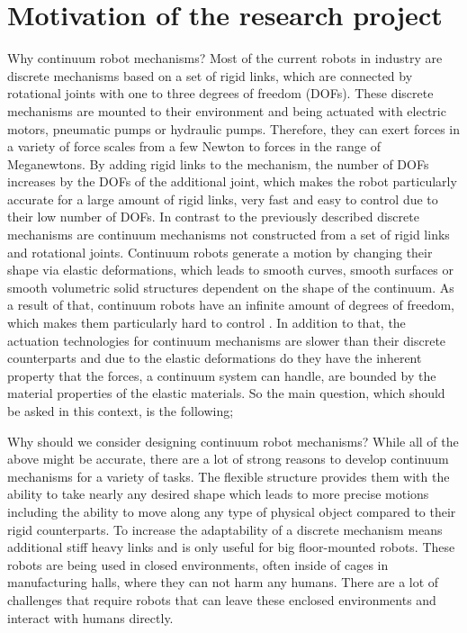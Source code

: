 \section{Motivation of the research project} \label{sec:motivation}
%
Why continuum robot mechanisms? Most of the current robots in industry are discrete mechanisms based on a set of rigid links, which are connected by rotational joints with one to three degrees of freedom (DOFs).
These discrete mechanisms are mounted to their environment and being actuated with electric motors, pneumatic pumps or hydraulic pumps. Therefore, they can exert forces in a 
variety of force scales from a few Newton to forces in the range of Meganewtons. By adding rigid links to the mechanism, the number of DOFs increases by the DOFs of the additional joint, which makes
the robot particularly accurate for a large amount of rigid links, very fast and easy to control due to their low number of DOFs. In contrast to the previously described discrete mechanisms are continuum mechanisms
 not constructed from a set of rigid links and rotational joints. Continuum robots generate a motion by changing their shape via elastic deformations, which leads to smooth curves,
 smooth surfaces or smooth volumetric solid structures dependent on the shape of the continuum. As a result of that, continuum robots have an infinite amount of degrees of freedom, which makes
 them particularly hard to control \cite{Robinson1999_conf}. In addition to that, the actuation technologies for continuum mechanisms are slower than their discrete counterparts and due to the 
 elastic deformations do they have the inherent property that the forces, a continuum system can handle, are bounded by the material properties of the elastic materials.
So the main question, which should be asked in this context, is the following; \par
Why should we consider designing continuum robot mechanisms?
%
While all of the above might be accurate, there are a lot of strong reasons to develop continuum mechanisms for a variety of tasks. The flexible structure provides them with the ability
to take nearly any desired shape which leads to more precise motions including the ability to move along any type of physical object compared to their rigid counterparts. To increase the
 adaptability of a discrete mechanism means additional stiff heavy links and is only useful for big floor-mounted robots. These robots are being used in closed environments,
often inside of cages in manufacturing halls, where they can not harm any humans. There are a lot of challenges that require robots that can leave these enclosed environments and interact with humans directly.
